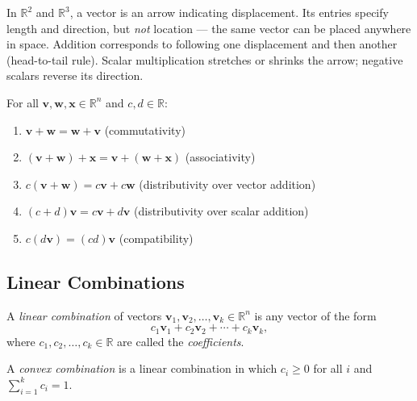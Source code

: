 \begin{remark*}
In $\mathbb{R}^2$ and $\mathbb{R}^3$, a vector is an arrow indicating displacement.
Its entries specify length and direction, but \emph{not} location —
the same vector can be placed anywhere in space.
Addition corresponds to following one displacement and then another (head-to-tail rule).
Scalar multiplication stretches or shrinks the arrow; negative scalars reverse its direction.
\end{remark*}

\begin{tcolorbox}[colback=thmbox, colframe=thmborder, arc=2pt,
  left=6pt, right=6pt, top=4pt, bottom=4pt,
  title={\small\textbf{Theorem (Properties of Vector Operations)}},
  fonttitle=\small\bfseries]
For all $\mathbf{v}, \mathbf{w}, \mathbf{x} \in \mathbb{R}^n$ and $c, d \in \mathbb{R}$:
\begin{enumerate}
  \item $\mathbf{v} + \mathbf{w} = \mathbf{w} + \mathbf{v}$ \hfill (commutativity)
  \item $(\mathbf{v} + \mathbf{w}) + \mathbf{x} = \mathbf{v} + (\mathbf{w} + \mathbf{x})$ \hfill (associativity)
  \item $c(\mathbf{v} + \mathbf{w}) = c\mathbf{v} + c\mathbf{w}$ \hfill (distributivity over vector addition)
  \item $(c + d)\mathbf{v} = c\mathbf{v} + d\mathbf{v}$ \hfill (distributivity over scalar addition)
  \item $c(d\mathbf{v}) = (cd)\mathbf{v}$ \hfill (compatibility)
\end{enumerate}
\end{tcolorbox}

\subsection{Linear Combinations}

\begin{tcolorbox}[colback=propbox, colframe=propborder, arc=2pt,
  left=6pt, right=6pt, top=4pt, bottom=4pt,
  title={\small\textbf{Definition (Linear Combination)}},
  fonttitle=\small\bfseries]
A \emph{linear combination} of vectors $\mathbf{v}_1, \mathbf{v}_2, \ldots, \mathbf{v}_k \in \mathbb{R}^n$
is any vector of the form
\[
  c_1\mathbf{v}_1 + c_2\mathbf{v}_2 + \cdots + c_k\mathbf{v}_k,
\]
where $c_1, c_2, \ldots, c_k \in \mathbb{R}$ are called the \emph{coefficients}.

A \emph{convex combination} is a linear combination in which $c_i \geq 0$
for all $i$ and $\sum_{i=1}^k c_i = 1$.
\end{tcolorbox}

